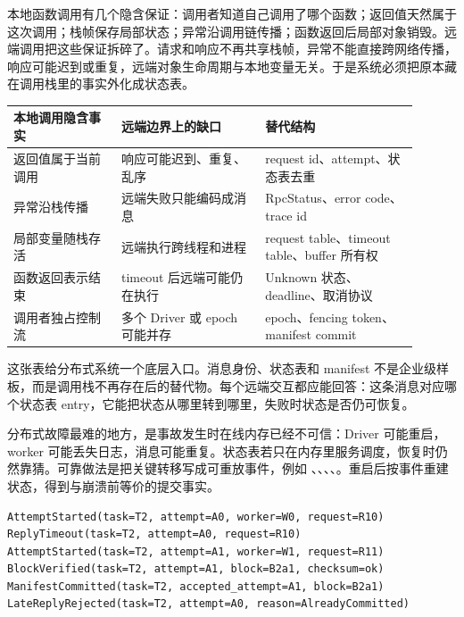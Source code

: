 本地函数调用有几个隐含保证：调用者知道自己调用了哪个函数；返回值天然属于这次调用；栈帧保存局部状态；异常沿调用链传播；函数返回后局部对象销毁。远端调用把这些保证拆碎了。请求和响应不再共享栈帧，异常不能直接跨网络传播，响应可能迟到或重复，远端对象生命周期与本地变量无关。于是系统必须把原本藏在调用栈里的事实外化成状态表。

\begin{center}
\small
\begin{tabular}{@{}p{0.24\linewidth}p{0.32\linewidth}p{0.34\linewidth}@{}}
\toprule
本地调用隐含事实 & 远端边界上的缺口 & 替代结构 \\
\midrule
返回值属于当前调用 & 响应可能迟到、重复、乱序 & request id、attempt、状态表去重 \\
异常沿栈传播 & 远端失败只能编码成消息 & RpcStatus、error code、trace id \\
局部变量随栈存活 & 远端执行跨线程和进程 & request table、timeout table、buffer 所有权 \\
函数返回表示结束 & timeout 后远端可能仍在执行 & Unknown 状态、deadline、取消协议 \\
调用者独占控制流 & 多个 Driver 或 epoch 可能并存 & epoch、fencing token、manifest commit \\
\bottomrule
\end{tabular}
\end{center}

这张表给分布式系统一个底层入口。消息身份、状态表和 manifest 不是企业级样板，而是调用栈不再存在后的替代物。每个远端交互都应能回答：这条消息对应哪个状态表 entry，它能把状态从哪里转到哪里，失败时状态是否仍可恢复。

分布式故障最难的地方，是事故发生时在线内存已经不可信：Driver 可能重启，worker 可能丢失日志，消息可能重复。状态表若只在内存里服务调度，恢复时仍然靠猜。可靠做法是把关键转移写成可重放事件，例如 、、、、。重启后按事件重建状态，得到与崩溃前等价的提交事实。

\begin{lstlisting}[numbers=none,caption={远端 attempt 的可重放事件}]
AttemptStarted(task=T2, attempt=A0, worker=W0, request=R10)
ReplyTimeout(task=T2, attempt=A0, request=R10)
AttemptStarted(task=T2, attempt=A1, worker=W1, request=R11)
BlockVerified(task=T2, attempt=A1, block=B2a1, checksum=ok)
ManifestCommitted(task=T2, accepted_attempt=A1, block=B2a1)
LateReplyRejected(task=T2, attempt=A0, reason=AlreadyCommitted)
\end{lstlisting}


